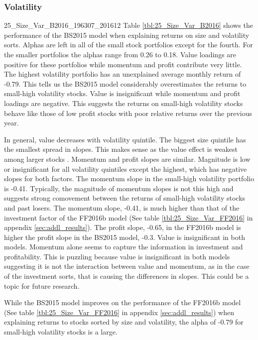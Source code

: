 
\subsubsection{Volatility}

{25_Size_Var_B2016_196307_201612}
Table \ref{tbl:25_Size_Var_B2016} shows the performance of the BS2015 model when
explaining returns on size and volatility sorts. Alphas are left in all of the small stock
portfolios except for the fourth. For the smaller portfolios the alphas range from 0.26 to
0.18. Value loadings are positive for these portfolios while momentum and profit
contribute very little. The highest volatility portfolio has an unexplained average
monthly return of -0.79. This tells us the BS2015 model considerably overestimates the
returns to small-high volatility stocks. Value is insignificant while momentum and profit
loadings are negative. This suggests the returns on small-high volatility stocks behave
like those of low profit stocks with poor relative returns over the previous year.

In general, value decreases with volatility quintile. The biggest size quintile has the
smallest spread in slopes. This makes sense as the value effect is weakest among larger
stocks \parencite{asness2015fact}. Momentum and profit slopes are similar. Magnitude is
low or insignificant for all volatility quintiles except the highest, which has negative
slopes for both factors. The momentum slope in the small-high volatility portfolio is
-0.41. Typically, the magnitude of momentum slopes is not this high and suggests strong
comovement between the returns of small-high volatility stocks and past losers. The
momentum slope, -0.41, is much higher than that of the investment factor of the FF2016b
model (See table \ref{tbl:25_Size_Var_FF2016} in appendix \ref{sec:addl_results}). The
profit slope, -0.65, in the FF2016b model is higher the profit slope in the BS2015 model,
-0.3. Value is insignificant in both models. Momentum alone seems to capture the
information in investment and profitability. This is puzzling because value is
insignificant in both models suggesting it is not the interaction between value and
momentum, as in the case of the investment sorts, that is causing the differences in
slopes. This could be a topic for future research.

While the BS2015 model improves on the performance of the FF2016b model (See table
\ref{tbl:25_Size_Var_FF2016} in appendix \ref{sec:addl_results}) when explaining returns
to stocks sorted by size and volatility, the alpha of -0.79 for small-high volatility
stocks is a large.